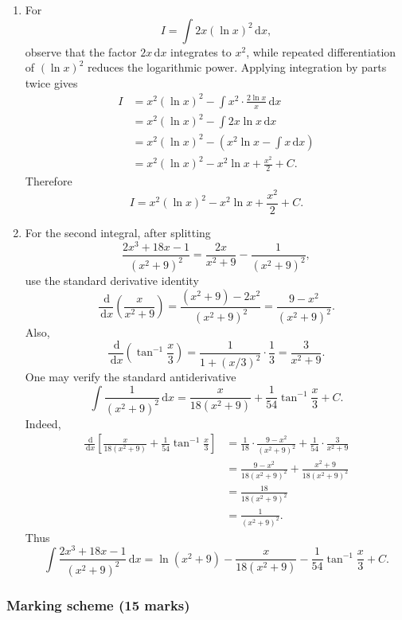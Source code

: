 \documentclass[12pt]{article}
\newcommand{\dd}{\,\mathrm{d}}
\begin{document}
\begin{enumerate}[label=(\alph*)]
\item For
\[
I=\int 2x(\ln x)^2\dd x,
\]
observe that the factor $2x\dd x$ integrates to $x^2$, while repeated differentiation of $(\ln x)^2$ reduces the logarithmic power. Applying integration by parts twice gives
\begin{align*}
I
&=x^2(\ln x)^2-\int x^2\cdot \frac{2\ln x}{x}\dd x\\
&=x^2(\ln x)^2-\int 2x\ln x\dd x\\
&=x^2(\ln x)^2-\left(x^2\ln x-\int x\dd x\right)\\
&=x^2(\ln x)^2-x^2\ln x+\frac{x^2}{2}+C.
\end{align*}
Therefore
\[
\boxed{I=x^2(\ln x)^2-x^2\ln x+\frac{x^2}{2}+C.}
\]

\item For the second integral, after splitting
\[
\frac{2x^3+18x-1}{(x^2+9)^2}
=
\frac{2x}{x^2+9}-\frac{1}{(x^2+9)^2},
\]
use the standard derivative identity
\[
\frac{\dd}{\dd x}\left(\frac{x}{x^2+9}\right)
=
\frac{(x^2+9)-2x^2}{(x^2+9)^2}
=
\frac{9-x^2}{(x^2+9)^2}.
\]
Also,
\[
\frac{\dd}{\dd x}\left(\tan^{-1}\frac{x}{3}\right)
=
\frac{1}{1+(x/3)^2}\cdot \frac13
=
\frac{3}{x^2+9}.
\]
One may verify the standard antiderivative
\[
\int \frac{1}{(x^2+9)^2}\dd x
=
\frac{x}{18(x^2+9)}+\frac{1}{54}\tan^{-1}\frac{x}{3}+C.
\]
Indeed,
\begin{align*}
\frac{\dd}{\dd x}\left[\frac{x}{18(x^2+9)}+\frac{1}{54}\tan^{-1}\frac{x}{3}\right]
&=\frac1{18}\cdot \frac{9-x^2}{(x^2+9)^2}
+\frac1{54}\cdot \frac{3}{x^2+9}\\
&=\frac{9-x^2}{18(x^2+9)^2}
+\frac{x^2+9}{18(x^2+9)^2}\\
&=\frac{18}{18(x^2+9)^2}\\
&=\frac{1}{(x^2+9)^2}.
\end{align*}
Thus
\[
\boxed{\int \frac{2x^3+18x-1}{(x^2+9)^2}\dd x
=\ln(x^2+9)-\frac{x}{18(x^2+9)}-\frac{1}{54}\tan^{-1}\frac{x}{3}+C.}
\]
\end{enumerate}

\subsubsection{Marking scheme (15 marks)}
\end{document}
